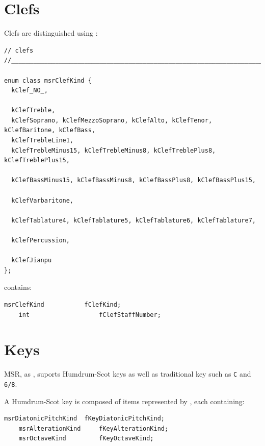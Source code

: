\section{Clefs}\label{Clefs}

Clefs are distinguished using :
\begin{lstlisting}[language=CPlusPlus]
// clefs
//______________________________________________________________________________

enum class msrClefKind {
  kClef_NO_,

  kClefTreble,
  kClefSoprano, kClefMezzoSoprano, kClefAlto, kClefTenor, kClefBaritone, kClefBass,
  kClefTrebleLine1,
  kClefTrebleMinus15, kClefTrebleMinus8, kClefTreblePlus8, kClefTreblePlus15,

  kClefBassMinus15, kClefBassMinus8, kClefBassPlus8, kClefBassPlus15,

  kClefVarbaritone,

  kClefTablature4, kClefTablature5, kClefTablature6, kClefTablature7,

  kClefPercussion,

  kClefJianpu
};
\end{lstlisting}

 contains:
\begin{lstlisting}[language=CPlusPlus]
    msrClefKind           fClefKind;
    int                   fClefStaffNumber;
\end{lstlisting}


\section{Keys}\label{Keys}

MSR, as \mxml, suports Humdrum-Scot keys as well as traditional key such as {\tt C} and {\tt 6/8}.

A Humdrum-Scot key is composed of items represented by , each containing:
\begin{lstlisting}[language=CPlusPlus]
    msrDiatonicPitchKind  fKeyDiatonicPitchKind;
    msrAlterationKind     fKeyAlterationKind;
    msrOctaveKind         fKeyOctaveKind;
\end{lstlisting}

